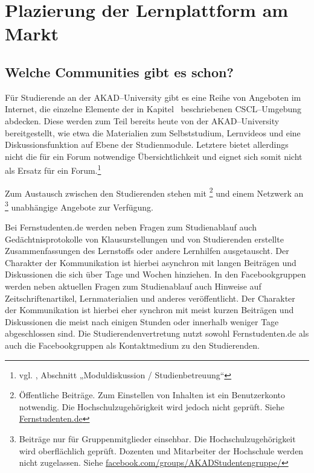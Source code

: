 \section{Plazierung der Lernplattform am Markt} %
\label{sec:plazierung_am_markt}

\subsection{Welche Communities gibt es schon?} %
\label{sub:marktanalyse_welche_communities_gibt_es_schon}
Für Studierende an der AKAD–University gibt es eine Reihe von Angeboten im Internet, die einzelne Elemente der in Kapitel~ beschriebenen \ac{CSCL}–Umgebung abdecken. Diese werden zum Teil bereits heute von der AKAD–University bereitgestellt, wie etwa die Materialien zum Selbststudium, Lernvideos und eine Diskussionsfunktion auf Ebene der Studienmodule. Letztere bietet allerdings nicht die für ein Forum notwendige Übersichtlichkeit und eignet sich somit nicht als Ersatz für ein Forum.\footnote{vgl. \cite{defstud}, Abschnitt „Moduldiskussion / Studienbetreuung“}

Zum Austausch zwischen den Studierenden stehen mit \footnote{Öffentliche Beiträge. Zum Einstellen von Inhalten ist ein Benutzerkonto notwendig. Die Hochschulzugehörigkeit wird jedoch nicht geprüft. Siehe \url{Fernstudenten.de}} und einem Netzwerk an \footnote{Beiträge nur für Gruppenmitglieder einsehbar. Die Hochschulzugehörigkeit wird oberflächlich geprüft. Dozenten und Mitarbeiter der Hochschule werden nicht zugelassen. Siehe \url{facebook.com/groups/AKADStudentengruppe/}} unabhängige Angebote zur Verfügung.

Bei Fernstudenten.de werden neben Fragen zum Studienablauf auch Gedächtnisprotokolle von Klausurstellungen und von Studierenden erstellte Zusammenfassungen des Lernstoffs oder andere Lernhilfen ausgetauscht. Der Charakter der Kommunikation ist hierbei asynchron mit langen Beiträgen und Diskussionen die sich über Tage und Wochen hinziehen. In den Facebookgruppen werden neben aktuellen Fragen zum Studienablauf auch Hinweise auf Zeitschriftenartikel, Lernmaterialien und anderes veröffentlicht. Der Charakter der Kommunikation ist hierbei eher synchron mit meist kurzen Beiträgen und Diskussionen die meist nach einigen Stunden oder innerhalb weniger Tage abgeschlossen sind.
Die Studierendenvertretung nutzt sowohl Fernstudenten.de als auch die Facebookgruppen als Kontaktmedium zu den Studierenden.

